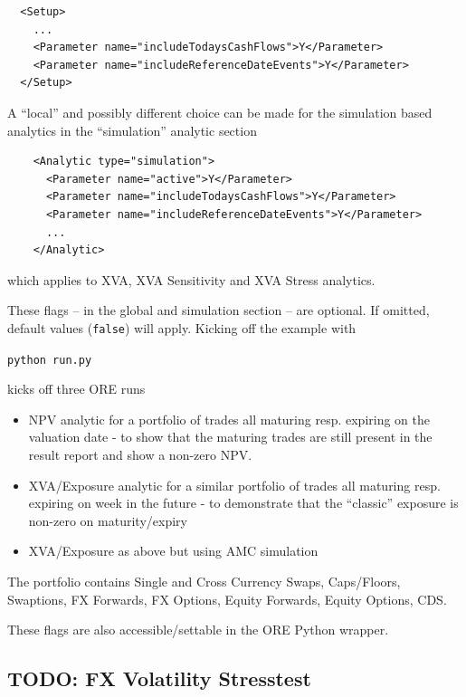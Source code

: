 \begin{verbatim}
  <Setup>
    ...
    <Parameter name="includeTodaysCashFlows">Y</Parameter>
    <Parameter name="includeReferenceDateEvents">Y</Parameter>
  </Setup>
\end{verbatim}

A ``local'' and possibly different choice can be made for the simulation based analytics
in the ``simulation'' analytic section

\begin{verbatim}
    <Analytic type="simulation">
      <Parameter name="active">Y</Parameter>
      <Parameter name="includeTodaysCashFlows">Y</Parameter>
      <Parameter name="includeReferenceDateEvents">Y</Parameter>
      ...
    </Analytic>
\end{verbatim}

which applies to XVA, XVA Sensitivity and XVA Stress analytics.

These flags -- in the global and simulation section -- are optional. If omitted, default values
({\tt false}) will apply. Kicking off the example with \\

\medskip

\centerline{\tt python run.py}

\medskip
kicks off three ORE runs
\begin{itemize}
\item NPV analytic for a portfolio of trades all maturing resp. expiring on the valuation date -
  to show that the maturing trades are still present in the result report and show a non-zero NPV.
\item XVA/Exposure analytic for a similar portfolio of trades all maturing resp. expiring on week in the
  future - to demonstrate that the ``classic'' exposure is non-zero on maturity/expiry
\item XVA/Exposure as above but using AMC simulation
\end{itemize}

The portfolio contains Single and Cross Currency Swaps, Caps/Floors, Swaptions, FX Forwards, FX Options,
Equity Forwards, Equity Options, CDS.

These flags are also accessible/settable in the ORE Python wrapper.

\subsection{TODO: FX Volatility Stresstest}%
\label{example:77}

